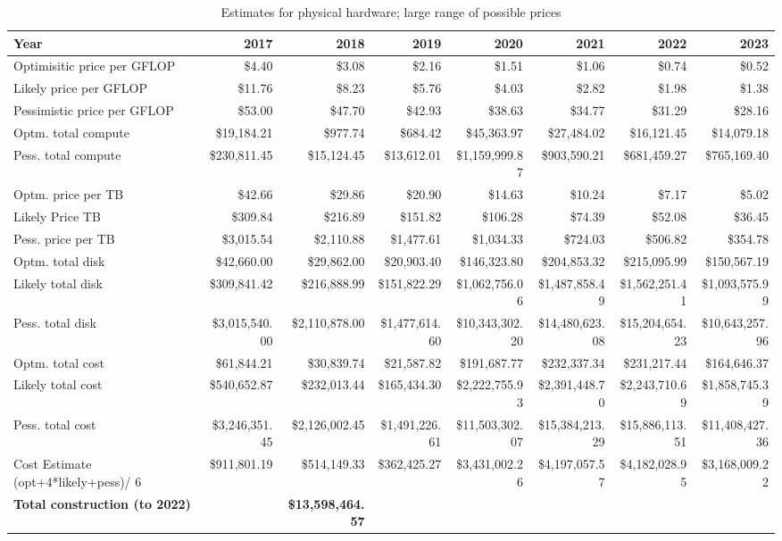 \tiny \begin{longtable} { |p{}  |r  |r  |r  |r  |r  |r  |r |} 
\caption{Estimates for physical hardware; large range of possible prices  \label{tab:Physical}}\\ 
\hline 
\textbf{Year}&\textbf{2017}&\textbf{2018}&\textbf{2019}&\textbf{2020}&\textbf{2021}&\textbf{2022}&\textbf{2023} \\ \hline
{Optimisitic price per GFLOP}&{\$4.40}&{\$3.08}&{\$2.16}&{\$1.51}&{\$1.06}&{\$0.74}&{\$0.52} \\ \hline
{Likely price per GFLOP}&{\$11.76}&{\$8.23}&{\$5.76}&{\$4.03}&{\$2.82}&{\$1.98}&{\$1.38} \\ \hline
{Pessimistic price per GFLOP}&{\$53.00}&{\$47.70}&{\$42.93}&{\$38.63}&{\$34.77}&{\$31.29}&{\$28.16} \\ \hline
{Optm. total compute}&{\$19,184.21}&{\$977.74}&{\$684.42}&{\$45,363.97}&{\$27,484.02}&{\$16,121.45}&{\$14,079.18} \\ \hline
{Pess. total compute}&{\$230,811.45}&{\$15,124.45}&{\$13,612.01}&{\$1,159,999.87}&{\$903,590.21}&{\$681,459.27}&{\$765,169.40} \\ \hline
{Optm. price per TB}&{\$42.66}&{\$29.86}&{\$20.90}&{\$14.63}&{\$10.24}&{\$7.17}&{\$5.02} \\ \hline
{Likely Price TB}&{\$309.84}&{\$216.89}&{\$151.82}&{\$106.28}&{\$74.39}&{\$52.08}&{\$36.45} \\ \hline
{Pess. price per TB}&{\$3,015.54}&{\$2,110.88}&{\$1,477.61}&{\$1,034.33}&{\$724.03}&{\$506.82}&{\$354.78} \\ \hline
{Optm. total disk}&{\$42,660.00}&{\$29,862.00}&{\$20,903.40}&{\$146,323.80}&{\$204,853.32}&{\$215,095.99}&{\$150,567.19} \\ \hline
{Likely total disk}&{\$309,841.42}&{\$216,888.99}&{\$151,822.29}&{\$1,062,756.06}&{\$1,487,858.49}&{\$1,562,251.41}&{\$1,093,575.99} \\ \hline
{Pess. total disk}&{\$3,015,540.00}&{\$2,110,878.00}&{\$1,477,614.60}&{\$10,343,302.20}&{\$14,480,623.08}&{\$15,204,654.23}&{\$10,643,257.96} \\ \hline
{Optm. total cost}&{\$61,844.21}&{\$30,839.74}&{\$21,587.82}&{\$191,687.77}&{\$232,337.34}&{\$231,217.44}&{\$164,646.37} \\ \hline
{Likely total cost}&{\$540,652.87}&{\$232,013.44}&{\$165,434.30}&{\$2,222,755.93}&{\$2,391,448.70}&{\$2,243,710.69}&{\$1,858,745.39} \\ \hline
{Pess. total cost}&{\$3,246,351.45}&{\$2,126,002.45}&{\$1,491,226.61}&{\$11,503,302.07}&{\$15,384,213.29}&{\$15,886,113.51}&{\$11,408,427.36} \\ \hline
{Cost Estimate (opt+4*likely+pess)/ 6}&{\$911,801.19}&{\$514,149.33}&{\$362,425.27}&{\$3,431,002.26}&{\$4,197,057.57}&{\$4,182,028.95}&{\$3,168,009.22} \\ \hline
\textbf{Total construction (to 2022)}&\textbf{}&\textbf{\$13,598,464.57}&&&&& \\ \hline
\end{longtable} \normalsize
